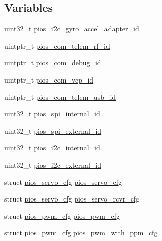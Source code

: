 \subsection*{\-Variables}
\begin{DoxyCompactItemize}
\item 
uint32\-\_\-t \hyperlink{group___flying_f3_gabc8bb1b39127491c9c6a372ffa3adccf}{pios\-\_\-i2c\-\_\-gyro\-\_\-accel\-\_\-adapter\-\_\-id}
\item 
uintptr\-\_\-t \hyperlink{group___flying_f3_gae48e848f715b08971e23528feee79339}{pios\-\_\-com\-\_\-telem\-\_\-rf\-\_\-id}
\item 
uintptr\-\_\-t \hyperlink{group___flying_f3_ga14dc9e3d330b80a37a9699c2112358e0}{pios\-\_\-com\-\_\-debug\-\_\-id}
\item 
uintptr\-\_\-t \hyperlink{group___flying_f3_gaaeb3e0d65ed5c6e7b921c54e1ad905db}{pios\-\_\-com\-\_\-vcp\-\_\-id}
\item 
uintptr\-\_\-t \hyperlink{group___flying_f3_ga513cc36d72b76de2fcb75ff233a79a4a}{pios\-\_\-com\-\_\-telem\-\_\-usb\-\_\-id}
\item 
uint32\-\_\-t \hyperlink{group___flying_f3_ga1ddbcf6dfeda2fbe6bbf0b14f011032f}{pios\-\_\-spi\-\_\-internal\-\_\-id}
\item 
uint32\-\_\-t \hyperlink{group___flying_f3_gabe70a8116c4e52c82ce8151bf5d64dec}{pios\-\_\-spi\-\_\-external\-\_\-id}
\item 
uint32\-\_\-t \hyperlink{group___flying_f3_gad2c74451613ce4fb69f79e9941dde55e}{pios\-\_\-i2c\-\_\-internal\-\_\-id}
\item 
uint32\-\_\-t \hyperlink{group___flying_f3_gaf4ee551b590f93e58b18620150d923e6}{pios\-\_\-i2c\-\_\-external\-\_\-id}
\item 
struct \hyperlink{structpios__servo__cfg}{pios\-\_\-servo\-\_\-cfg} \hyperlink{group___flying_f3_ga57a87ef16d7949a9cc3589efc8d88a28}{pios\-\_\-servo\-\_\-cfg}
\item 
struct \hyperlink{structpios__servo__cfg}{pios\-\_\-servo\-\_\-cfg} \hyperlink{group___flying_f3_gaa111328ef9a12c806ed1c24b93d4f663}{pios\-\_\-servo\-\_\-rcvr\-\_\-cfg}
\item 
struct \hyperlink{structpios__pwm__cfg}{pios\-\_\-pwm\-\_\-cfg} \hyperlink{group___flying_f3_ga7587f8e174df90bef8cec1edfa9e14c1}{pios\-\_\-pwm\-\_\-cfg}
\item 
struct \hyperlink{structpios__pwm__cfg}{pios\-\_\-pwm\-\_\-cfg} \hyperlink{group___flying_f3_ga6a7a8338c617f18384f3b3c5678f5505}{pios\-\_\-pwm\-\_\-with\-\_\-ppm\-\_\-cfg}
\item 

\end{DoxyCompactItemize}
